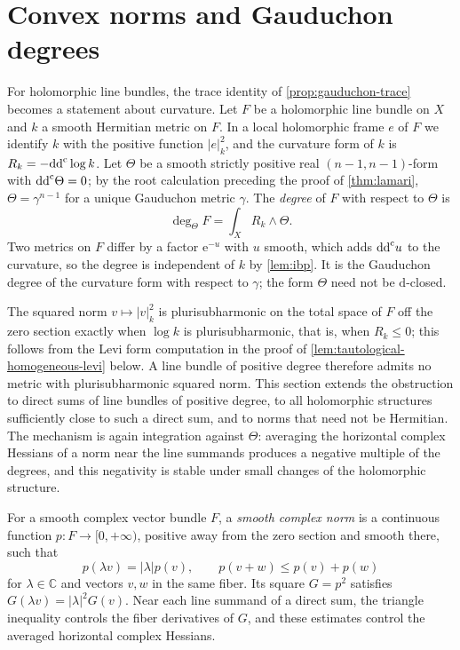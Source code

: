 \section{Convex norms and Gauduchon degrees}
\label{sec:convex-bundle-norm-obstruction}

For holomorphic line bundles, the trace identity of \cref{prop:gauduchon-trace} becomes a statement about curvature. Let $F$ be a holomorphic line bundle on $X$ and $k$ a smooth Hermitian metric on $F$. In a local holomorphic frame $e$ of $F$ we identify $k$ with the positive function $|e|_k^2$, and the curvature form of $k$ is $R_k=-\mathrm{dd}^{\mathrm{c}}\log k$. Let $\Theta$ be a smooth strictly positive real $(n-1,n-1)$-form with $\mathrm{dd}^{\mathrm{c}}\Theta=0$; by the root calculation preceding the proof of \cref{thm:lamari}, $\Theta=\gamma^{n-1}$ for a unique Gauduchon metric $\gamma$. The \emph{degree} of $F$ with respect to $\Theta$ is
\[
 \deg_\Theta F=\int_XR_k\wedge\Theta.
\]
Two metrics on $F$ differ by a factor $\mathrm e^{-u}$ with $u$ smooth, which adds $\mathrm{dd}^{\mathrm{c}} u$ to the curvature, so the degree is independent of $k$ by \cref{lem:ibp}. It is the Gauduchon degree of the curvature form with respect to $\gamma$; the form $\Theta$ need not be $\mathrm d$-closed.

The squared norm $v\mapsto|v|_k^2$ is plurisubharmonic on the total space of $F$ off the zero section exactly when $\log k$ is plurisubharmonic, that is, when $R_k\leq0$; this follows from the Levi form computation in the proof of \cref{lem:tautological-homogeneous-levi} below. A line bundle of positive degree therefore admits no metric with plurisubharmonic squared norm. This section extends the obstruction to direct sums of line bundles of positive degree, to all holomorphic structures sufficiently close to such a direct sum, and to norms that need not be Hermitian. The mechanism is again integration against $\Theta$: averaging the horizontal complex Hessians of a norm near the line summands produces a negative multiple of the degrees, and this negativity is stable under small changes of the holomorphic structure.

For a smooth complex vector bundle $F$, a \emph{smooth complex norm} is a continuous function $p\colon F\to[0,+\infty)$, positive away from the zero section and smooth there, such that
\[
 p(\lambda v)=|\lambda|p(v),\qquad p(v+w)\leq p(v)+p(w)
\]
for $\lambda\in\mathbb C$ and vectors $v,w$ in the same fiber. Its square $G=p^2$ satisfies $G(\lambda v)=|\lambda|^2G(v)$. Near each line summand of a direct sum, the triangle inequality controls the fiber derivatives of $G$, and these estimates control the averaged horizontal complex Hessians.

